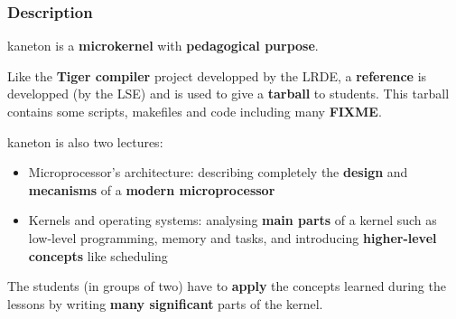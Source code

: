 \begin{frame}
  \frametitle{Description}

  kaneton is a \textbf{microkernel} with \textbf{pedagogical purpose}.

  \-

  Like the \textbf{Tiger compiler} project developped by the LRDE, a
  \textbf{reference} is developped (by the LSE) and is used to give a
  \textbf{tarball} to students. This tarball contains some scripts,
  makefiles and code including many \textbf{FIXME}.

  \-

  kaneton is also two lectures:

  \begin{itemize}
    \item
    Microprocessor's architecture: describing completely the \textbf{design}
    and \textbf{mecanisms} of a \textbf{modern microprocessor}
    \item
    Kernels and operating systems: analysing \textbf{main parts} of a kernel
    such as low-level programming, memory and tasks, and introducing
    \textbf{higher-level concepts} like scheduling
  \end{itemize}

  \-

  The students (in groups of two) have to \textbf{apply} the concepts
  learned during the lessons by writing \textbf{many significant}
  parts of the kernel.

\end{frame}


